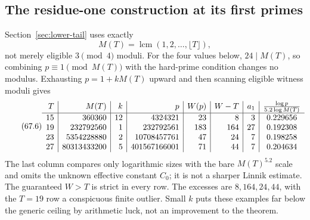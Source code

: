 \documentclass[10pt,reqno]{amsart}
\theoremstyle{definition}
\newcommand{\lcm}{\operatorname {lcm}}
\newcommand{\1}{\mathbf 1}
\begin{document}
\subsection{The residue-one construction at its first primes}
Section~\ref{sec:lower-tail} uses exactly
\begin{equation}\tag{67.5}
                         M(T)=\lcm(1,2,\ldots,\lfloor T\rfloor),
\end{equation}
not merely eligible $3\pmod4$ moduli.  For the four values below,
$24\mid M(T)$, so combining $p\equiv1\pmod {M(T)}$ with the hard-prime
condition changes no modulus.  Exhausting $p=1+kM(T)$ upward and then
scanning eligible witness moduli gives
\begin{equation}\tag{67.6}
\begin{array}{r|r|r|r|r|r|r|c}
T&M(T)&k&p& W(p)&W-T&a_1&{\log p\over5.2\log M(T)}\\ \hline
15&360360&12&4324321&23&8&3&0.229656\\
19&232792560&1&232792561&183&164&27&0.192308\\
23&5354228880&2&10708457761&47&24&7&0.198258\\
27&80313433200&5&401567166001&71&44&7&0.204634
\end{array}
\end{equation}
The last column compares only logarithmic sizes with the bare $M(T)^{5.2}$
scale and omits the unknown effective constant $C_0$; it is not a sharper
Linnik estimate.  The guaranteed $W>T$ is strict in every row.  The excesses
are $8,164,24,44$, with the $T=19$ row a conspicuous finite outlier.  Small
$k$ puts these examples far below the generic ceiling by arithmetic luck,
not an improvement to the theorem.
\end{document}
